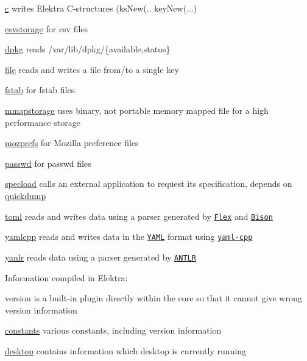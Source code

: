 \begin{DoxyItemize}
\item \hyperlink{autotoc_md70_src_plugins_c_README_md}{c} writes Elektra C-\/structures ({\ttfamily ks\+New(.. key\+New(...})
\item \hyperlink{autotoc_md124_src_plugins_csvstorage_README_md}{csvstorage} for csv files
\item \hyperlink{autotoc_md192_src_plugins_dpkg_README_md}{dpkg} reads /var/lib/dpkg/\{available,status\}
\item \hyperlink{autotoc_md216_src_plugins_file_README_md}{file} reads and writes a file from/to a single key
\item \hyperlink{autotoc_md230_src_plugins_fstab_README_md}{fstab} for fstab files.
\item \hyperlink{autotoc_md431_src_plugins_mmapstorage_README_md}{mmapstorage} uses binary, not portable memory mapped file for a high performance storage
\item \hyperlink{autotoc_md474_src_plugins_mozprefs_README_md}{mozprefs} for Mozilla preference files
\item \hyperlink{autotoc_md516_src_plugins_passwd_README_md}{passwd} for passwd files
\item \hyperlink{autotoc_md658_src_plugins_specload_README_md}{specload} calls an external application to request its specification, depends on \hyperlink{autotoc_md562_src_plugins_quickdump_README_md}{quickdump}
\item \hyperlink{autotoc_md693_src_plugins_toml_README_md}{toml} reads and writes data using a parser generated by \href{https://github.com/westes/flex}{\tt Flex} and \href{https://www.gnu.org/software/bison}{\tt Bison}
\item \hyperlink{autotoc_md865_src_plugins_yamlcpp_README_md}{yamlcpp} reads and writes data in the \href{http://www.yaml.org}{\tt Y\+A\+ML} format using \href{https://github.com/jbeder/yaml-cpp}{\tt yaml-\/cpp}
\item \hyperlink{autotoc_md955_src_plugins_yanlr_README_md}{yanlr} reads data using a parser generated by \href{http://www.antlr.org}{\tt A\+N\+T\+LR}
\end{DoxyItemize}

Information compiled in Elektra\+:


\begin{DoxyItemize}
\item version is a built-\/in plugin directly within the core so that it cannot give wrong version information
\item \hyperlink{autotoc_md104_src_plugins_constants_README_md}{constants} various constants, including version information
\item \hyperlink{autotoc_md169_src_plugins_desktop_README_md}{desktop} contains information which desktop is currently running
\end{DoxyItemize}

